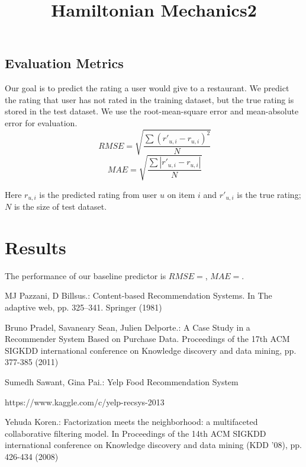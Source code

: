 \documentclass{llncs}
\begin{document}
\subsection{Evaluation Metrics}
Our goal is to predict the rating a user would give to a restaurant. We predict the rating that user has not rated in the training dataset, but the true rating is stored in the test dataset. We use the root-mean-square error and mean-absolute error for evaluation.
\begin{equation}
\ RMSE = \sqrt{\frac{\sum{\left(r'_{u,i} - r_{u,i}\right)}^2}{N}}
\end{equation}
\begin{equation}
\ MAE = \sqrt{\frac{\sum{\left|r'_{u,i} - r_{u,i}\right|}}{N}}
\end{equation}

Here $r_{u,i}$ is the predicted rating from user $u$ on item $i$ and $r'_{u,i}$ is the true rating; $N$ is the size of test dataset. 

\section{Results}
The performance of our baseline predictor is $RMSE = $, $MAE= $.




%
%
\begin{thebibliography}{5}
%
MJ Pazzani, D Billsus.:
Content-based Recommendation Systems. In The adaptive web, pp. 325–341. Springer (1981) 

Bruno Pradel, Savaneary Sean, Julien Delporte.: 
A Case Study in a Recommender System Based on Purchase Data. Proceedings of the 17th ACM SIGKDD international conference on Knowledge discovery and data mining, pp. 377-385 (2011)

Sumedh Sawant, Gina Pai.:
Yelp Food Recommendation System

https://www.kaggle.com/c/yelp-recsys-2013

Yehuda Koren.: 
Factorization meets the neighborhood: a multifaceted collaborative filtering model. In Proceedings of the 14th ACM SIGKDD international conference on Knowledge discovery and data mining (KDD '08), pp. 426-434 (2008)

\end{thebibliography}

%
%
\title{Hamiltonian Mechanics2}
\end{document}
